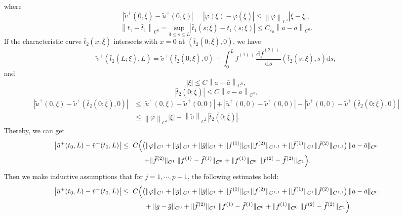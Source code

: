 \documentclass[a4paper,reqno,11pt]{amsart}
\numberwithin{equation}{section} %
\begin{document}
where
$$
\left| \tilde{v}^{+}(0,\bar{\xi})-\tilde{u}^{+}(0,\xi ) \right|=\left| \varphi (\xi )-\varphi (\bar{\xi}) \right|\leq \left\| \varphi \right\| _{C^1}\left| \xi -\bar{\xi} \right|,
$$
$$
\left\| t_1-\bar{t}_1 \right\| _{C^0} =\underset{0\le s\le L}{\mathrm{sup}}\left| \bar{t}_1(s;\bar{\xi})-t_1(s;\xi ) \right|\leq C_{\varepsilon _0}\left\| a-\bar{a} \right\| _{C^0}.
$$
If the characteristic curve $\bar{t} _2(x;\bar{\xi}  )$ intersects with $x=0$ at $(\bar{t}_2(0;\bar{\xi} ),0)$, we have
$$
\tilde{v}^{+}\left( \bar{t}_2\left( L;\bar{\xi} \right) ,L \right) =\tilde{v}^{+}\left( \bar{t}_2\left( 0;\bar{\xi} \right) ,0 \right) +\int_0^L{\bar{f}^{(1)+}\frac{\mathrm{d}\bar{f}^{(2)+}}{\mathrm{d}s}\left( \bar{t}_2\left( s;\bar{\xi} \right) ,s \right) \mathrm{d}s},
$$
and
$$
	|\xi |\leq C\left\| a-\bar{a} \right\| _{C^0},
$$
$$
	\left| \bar{t}_2(0;\bar{\xi}) \right|\leq C\left\| a-\bar{a} \right\| _{C^0},
$$
$$
\begin{aligned}
	\left| \tilde{u}^{+}(0,\xi )-\tilde{v}^{+}\left( \bar{t}_2(0;\bar{\xi}),0 \right) \right|&\leq \left| \tilde{u}^{+}(0,\xi )-\tilde{u}^{+}(0,0) \right|+\left| \tilde{u}^{+}(0,0)-\tilde{v}^{+}(0,0) \right|+\left| \tilde{v}^{+}(0,0)-\tilde{v}^{+}\left( \bar{t}_2(0;\bar{\xi}),0 \right) \right|\\
	&\le \left\| \varphi \right\| _{C^1}\left| \xi \right|+\left\| \tilde{v} \right\| _{C^{\tilde{1}}}\left| \bar{t}_2(0;\bar{\xi}) \right|.
\end{aligned}
$$
Thereby, we can get
$$
\begin{aligned}
\bigl|\tilde u^+(t_0,L)-\tilde{v}^{+}(t_0,L)\bigr|
\le{}&\ C\Bigl(
  \bigl(\|\varphi\|_{C^{1}}+\|g\|_{C^{1}}+\|\bar g\|_{C^{1}}
   + \|f^{(1)}\|_{C^{1}}\|f^{(2)}\|_{C^{1,1}}
   + \|\bar f^{(1)}\|_{C^{1}}\|\bar f^{(2)}\|_{C^{1,1}}\bigr)\,
   \|a-\bar a\|_{C^{0}} \Bigr.\\
&\qquad \Bigl.+ \|\bar f^{(2)}\|_{C^{1}}\;\|f^{(1)}-\bar f^{(1)}\|_{C^{0}}
        + \|f^{(1)}\|_{C^{0}}\;\|f^{(2)}-\bar f^{(2)}\|_{C^{1}}
\Bigr).
\end{aligned}
$$
Then we make inductive assumptions that for $j=1,\cdots,p-1$, the following estimates hold:
$$
\begin{aligned}
\bigl|\tilde u^+(t_0,L)-\tilde{v}^{+}(t_0,L)\bigr|
\le{}&\ C\Bigl(
  \bigl(\|\varphi\|_{C^{1}}+\|g\|_{C^{1}}+\|\bar g\|_{C^{1}}
  + \|f^{(1)}\|_{C^{1}}\|f^{(2)}\|_{C^{1,1}}
  + \|\bar f^{(1)}\|_{C^{1}}\|\bar f^{(2)}\|_{C^{1,1}}\bigr)\,
  \|a-\bar a\|_{C^{0}} \Bigr.\\
&\qquad + \Bigl. \|g-\bar g\|_{C^{0}}
  + \|\bar f^{(2)}\|_{C^{1}}\;\|f^{(1)}-\bar f^{(1)}\|_{C^{0}}
  + \|f^{(1)}\|_{C^{0}}\;\|f^{(2)}-\bar f^{(2)}\|_{C^{1}}
\Bigr).
\end{aligned}
$$
\end{document}
